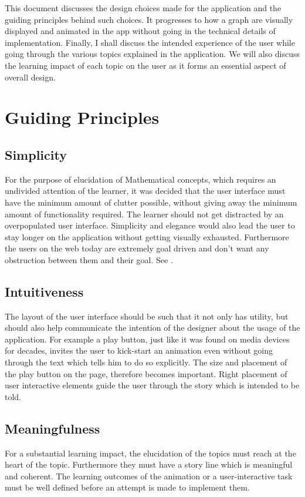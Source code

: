 
This document discusses the design choices made for the application and the
guiding principles behind such choices. It progresses to how a graph are
visually displayed and animated in the app without going in the technical
details of implementation. Finally, I shall discuss the intended experience of
the user while going through the various topics explained in the application.
We will also discuss the learning impact of each topic on the user as it forms an essential
aspect of overall design.

\section{Guiding Principles}

\subsection{Simplicity}
\label{design: simplicity}
For the purpose of elucidation of Mathematical concepts, which requires an
undivided attention of the learner, it was decided that the user interface must
have the minimum amount of clutter possible, without giving away the minimum
amount of functionality required. The learner should not get distracted by an
overpopulated user interface. Simplicity and elegance would also lead the user
to stay longer on the application without getting visually exhausted.
Furthermore the users on the web today are extremely goal driven and don't want any
obstruction between them and their goal. See \cite{Karvonen2000}.

\subsection{Intuitiveness}
The layout of the user interface should be such that it not only has utility,
but should also help communicate the intention of the designer about the usage
of the application. For example a play button, just like it was found on media
devices for decades, invites the user to kick-start an animation even without
going through the text which tells him to do so explicitly. The size and
placement of the play button on the page, therefore becomes important. Right
placement of user interactive elements guide the user through the story which
is intended to be told.

\subsection{Meaningfulness}
For a substantial learning impact, the elucidation of the topics must reach at
the heart of the topic. Furthermore they must have a story line which is
meaningful and coherent. The learning outcomes of the animation or a
user-interactive task must be well defined before an attempt is made to
implement them.

